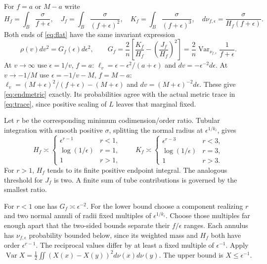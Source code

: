 \documentclass[11pt]{article}
\newcommand{\Var}{\operatorname{Var}}
\theoremstyle{remark}\newtheorem{remark}[theorem]{Remark}
\begin{document}
For $f=a$ or $M-a$ write
\[
 H_f=\int_B\frac{\sigma}{f+\epsilon},\quad
 J_f=\int_B\frac{\sigma}{(f+\epsilon)^2},\quad
 K_f=\int_B\frac{\sigma}{(f+\epsilon)^3},\quad
 d\nu_{f,\epsilon}=\frac{\sigma}{H_f(f+\epsilon)}.
\]
Both ends of \eqref{eq:flat} have the same invariant expression
\begin{equation}\label{eq:endmetric}
 \rho(v)dv^2=G_f(\epsilon)d\epsilon^2,
 \qquad G_f=\frac2n\left[\frac{K_f}{H_f}
             -\left(\frac{J_f}{H_f}\right)^2\right]
 =\frac2n\Var_{\nu_{f,\epsilon}}\frac1{f+\epsilon}.
\end{equation}
At $v\to\infty$ use $\epsilon=1/v$, $f=a$:
$\ell_v=\epsilon-\epsilon^2/(a+\epsilon)$ and
$dv=-\epsilon^{-2}d\epsilon$. At $v\to-1/M$ use
$\epsilon=-1/v-M$, $f=M-a$:
$\ell_v=(M+\epsilon)^2/(f+\epsilon)-(M+\epsilon)$ and
$dv=(M+\epsilon)^{-2}d\epsilon$. These give \eqref{eq:endmetric}
exactly. Its probabilities agree with the actual metric trace in
\eqref{eq:trace}, since positive scaling of $L$ leaves that marginal fixed.

Let $r$ be the corresponding minimum codimension/order ratio. Tubular
integration with smooth positive $\sigma$, splitting the normal radius
at $\epsilon^{1/k_i}$, gives
\[
 H_f\asymp\begin{cases}\epsilon^{r-1}&r<1,\\
 \log(1/\epsilon)&r=1,\\1&r>1,\end{cases}
 \qquad K_f\asymp\begin{cases}\epsilon^{r-3}&r<3,\\
 \log(1/\epsilon)&r=3,\\1&r>3.\end{cases}
\]
For $r>1$, $H_f$ tends to its finite positive endpoint integral. The
analogous threshold for $J_f$ is two. A finite sum of tube contributions
is governed by the smallest ratio.

For $r<1$ one has $G_f\asymp\epsilon^{-2}$. For the lower bound choose
a component realizing $r$ and two normal annuli of radii fixed multiples
of $\epsilon^{1/k_i}$. Choose those multiples far enough apart that the
two-sided bounds separate their $f/\epsilon$ ranges. Each annulus has
$\nu_{f,\epsilon}$ probability bounded below, since its weighted mass
and $H_f$ both have order $\epsilon^{r-1}$. The reciprocal values differ
by at least a fixed multiple of $\epsilon^{-1}$. Apply
$\Var X=\frac12\iint(X(x)-X(y))^2d\nu(x)d\nu(y)$.
The upper bound is $X\leq\epsilon^{-1}$.
\end{document}
